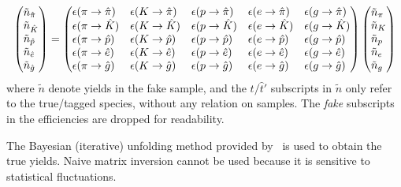 \begin{equation}
    \begin{pmatrix*}[l]
        \tilde{n}_{\hat{\pi}} \\
        \tilde{n}_{\hat{K}}   \\
        \tilde{n}_{\hat{p}}   \\
        \tilde{n}_{\hat{e}}   \\
        \tilde{n}_{\hat{g}}   \\
    \end{pmatrix*}
    =
    \begin{pmatrix*}[l]
        \misEff[\pi]{\hat{\pi}} & \misEff[K]{\hat{\pi}} & \misEff[p]{\hat{\pi}} & \misEff[e]{\hat{\pi}} & \misEff[g]{\hat{\pi}} \\
        \misEff[\pi]{\hat{K}}   & \misEff[K]{\hat{K}}   & \misEff[p]{\hat{K}}   & \misEff[e]{\hat{K}}   & \misEff[g]{\hat{K}}   \\
        \misEff[\pi]{\hat{p}}   & \misEff[K]{\hat{p}}   & \misEff[p]{\hat{p}}   & \misEff[e]{\hat{p}}   & \misEff[g]{\hat{p}}   \\
        \misEff[\pi]{\hat{e}}   & \misEff[K]{\hat{e}}   & \misEff[p]{\hat{e}}   & \misEff[e]{\hat{e}}   & \misEff[g]{\hat{e}}   \\
        \misEff[\pi]{\hat{g}}   & \misEff[K]{\hat{g}}   & \misEff[p]{\hat{g}}   & \misEff[e]{\hat{g}}   & \misEff[g]{\hat{g}}   \\
    \end{pmatrix*}
    \begin{pmatrix*}[l]
        \tilde{n}_{{\pi}} \\
        \tilde{n}_{{K}}   \\
        \tilde{n}_{{p}}   \\
        \tilde{n}_{{e}}   \\
        \tilde{n}_{{g}}   \\
    \end{pmatrix*}
\end{equation}
where $\tilde{n}$ denote yields in the fake \muon sample,
and the $t/\hat{t}'$ subscripts in $\tilde{n}$ only refer to
the true/tagged species, without any relation on \pidcalib samples.
The \emph{fake} subscripts in the efficiencies are dropped for readability.

The Bayesian (iterative) unfolding method provided by \RooUnfold\ is used to
obtain the true yields.
Naive matrix inversion cannot be used because it is sensitive to statistical
fluctuations.  %

